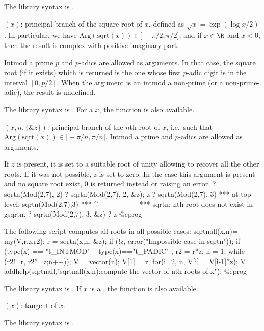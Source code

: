 The library syntax is .

$(x)$: \label{se:sqrt}principal branch of the square root of $x$, defined as $\sqrt{x} =
\exp(\log x / 2)$. In particular, we have
$\text{Arg}(\text{sqrt}(x))\in{} ]-\pi/2, \pi/2]$, and if $x\in \R$ and $x<0$,
then the result is complex with positive imaginary part.

Intmod a prime $p$ and $p$-adics are allowed as arguments. In that case,
the square root (if it exists) which is returned is the one whose
first $p$-adic digit is in the interval $[0,p/2]$. When the argument is an
intmod a non-prime (or a non-prime-adic), the result is undefined.

The library syntax is .
For a  $x$, the function
 is also available.

$(x,n,\{\&z\})$: \label{se:sqrtn}principal branch of the $n$th root of $x$,
i.e.~such that $\text{Arg}(\text{sqrt}(x))\in{} ]-\pi/n, \pi/n]$. Intmod
a prime and $p$-adics are allowed as arguments.

If $z$ is present, it is set to a suitable root of unity allowing to
recover all the other roots. If it was not possible, z is
set to zero. In the case this argument is present and no square root exist,
$0$ is returned instead or raising an error.
\bprog
? sqrtn(Mod(2,7), 2)
? sqrtn(Mod(2,7), 2, &z); z
? sqrtn(Mod(2,7), 3)
  ***   at top-level: sqrtn(Mod(2,7),3)
  ***                 ^-----------------
  *** sqrtn: nth-root does not exist in gsqrtn.
? sqrtn(Mod(2,7), 3,  &z)
? z
@eprog

The following script computes all roots in all possible cases:
\bprog
sqrtnall(x,n)=
{ my(V,r,z,r2);
  r = sqrtn(x,n, &z);
  if (!z, error("Impossible case in sqrtn"));
  if (type(x) == "t_INTMOD" || type(x)=="t_PADIC" ,
  r2 = r*z; n = 1;
  while (r2!=r, r2*=z;n++));
  V = vector(n); V[1] = r;
  for(i=2, n, V[i] = V[i-1]*z);
  V
}
addhelp(sqrtnall,"sqrtnall(x,n):compute the vector of nth-roots of x");
@eprog\noindent

The library syntax is .
If $x$ is a , the function
 is also available.

$(x)$: \label{se:tan}tangent of $x$.

The library syntax is .

